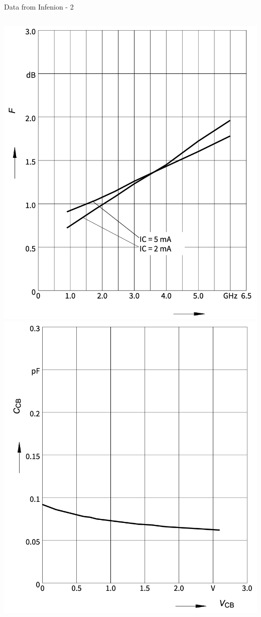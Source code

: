 \documentclass{beamer}
\begin{document}
\begin{frame}{Data from Infenion - 2}
\begin{columns}
  \includegraphics[width=\linewidth]{images/noise_fig_vs_f.png}
  \includegraphics[width=\linewidth]{images/c_cb_vs_f.png}
\end{columns}
  
\end{frame}
\end{document}
